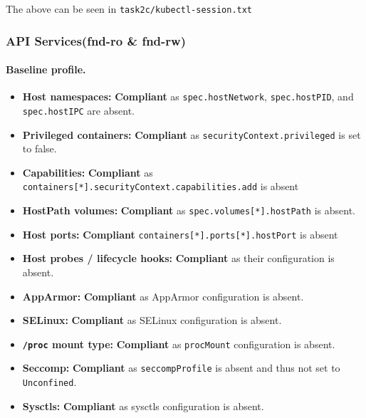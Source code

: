 \documentclass[11pt,a4paper]{article}
\begin{document}
	The above can be seen in \texttt{task2c/kubectl-session.txt}
	\subsubsection{API Services(fnd-ro \& fnd-rw)}
	
	\paragraph{Baseline profile.}
	
	\begin{itemize}
		\item \textbf{Host namespaces:} \textbf{Compliant} as \texttt{spec.hostNetwork}, \texttt{spec.hostPID}, and \texttt{spec.hostIPC} are absent.
		
		\item \textbf{Privileged containers:} \textbf{Compliant} as \texttt{securityContext.privileged} is set to false.
		
		\item \textbf{Capabilities:} \textbf{Compliant} as \texttt{containers[*].securityContext.capabilities.add} is absent
		
		\item \textbf{HostPath volumes:} \textbf{Compliant} as \texttt{spec.volumes[*].hostPath} is absent.
		
		\item \textbf{Host ports:} \textbf{Compliant} \texttt{containers[*].ports[*].hostPort} is absent
		
		\item \textbf{Host probes / lifecycle hooks:} \textbf{Compliant} as their configuration is absent.
		
		\item \textbf{AppArmor:} \textbf{Compliant} as AppArmor configuration is absent.
		
		\item \textbf{SELinux:} \textbf{Compliant} as SELinux configuration is absent.
		
		\item \textbf{\texttt{/proc} mount type:} \textbf{Compliant} as \texttt{procMount} configuration is absent.
		
		\item \textbf{Seccomp:} \textbf{Compliant} as \texttt{seccompProfile} is absent and thus not set to \texttt{Unconfined}.
			
		\item \textbf{Sysctls:} \textbf{Compliant} as sysctls configuration is absent. 
	\end{itemize}
	
\end{document}
